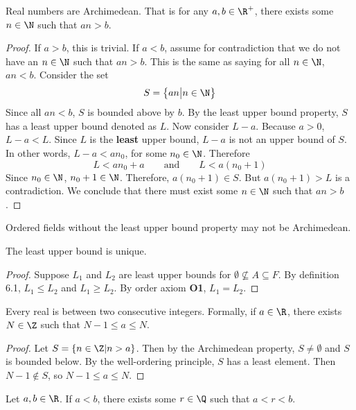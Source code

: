 \documentclass[10pt]{article}
\begin{document}
\begin{proposition}
    Real numbers are Archimedean. That is for any $a,b\in\R^+$, there exists some $n\in\N$ such that $an>b$.
\end{proposition}
\begin{proof}
    If $a>b$, this is trivial. If $a<b$, assume for contradiction that we do not have an $n\in\N$ such that $an>b$. This is the same as saying for all $n\in\N$, $an<b$. Consider the set 
    $$
        S=\left\{an\big|n\in\N\right\}
    $$
    Since all $an<b$, $S$ is bounded above by $b$. By the least upper bound property, $S$ has a least upper bound denoted as $L$. Now consider $L-a$. Because $a>0$, $L-a<L$. Since $L$ is the \textbf{least} upper bound, $L-a$ is not an upper bound of $S$. In other words, $L-a<an_0$, for some $n_0\in\N$. Therefore
    \[
        L<an_0+a \qquad \text{and}\qquad L<a(n_0+1)
    \]
    Since $n_0\in\N$, $n_0+1\in\N$. Therefore, $a(n_0+1)\in S$. But $a(n_0+1)>L$ is a contradiction. We conclude that there must exist some $n\in\N$ such that $an>b$.
\end{proof}
\begin{remark}
    Ordered fields without the least upper bound property may not be Archimedean.
\end{remark}
\begin{proposition}
    The least upper bound is unique. 
\end{proposition}
\begin{proof}
    Suppose $L_1$ and $L_2$ are least upper bounds for $\emptyset \nsubseteq A\subseteq F$. By definition 6.1, $L_1\leq L_2$ and $L_1\geq L_2$. By order axiom \textbf{O1}, $L_1=L_2$.
\end{proof}
\begin{proposition}
    Every real is between two consecutive integers. Formally, if $a\in\R$, there exists $N\in\Z$ such that $N-1\leq a\leq N$.
\end{proposition}
\begin{proof}
    Let $S=\{n\in\Z|n>a\}$. Then by the Archimedean property, $S\neq \emptyset$ and $S$ is bounded below. By the well-ordering principle, $S$ has a least element. Then $N-1\notin S$, so $N-1\leq a\leq N$.
\end{proof}
\begin{theorem}
    Let $a,b\in \R$. If $a<b$, there exists some $ r\in\Q$ such that $a<r<b$.
\end{theorem}
\end{document}
